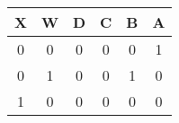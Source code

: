 \begin{tabular}{|c|c||c|c|c|c|}
\hline
X & W & D & C & B & A\\
\hline
0 & 0 & 0 & 0 & 0 & 1\\
0 & 1 & 0 & 0 & 1 & 0\\
1 & 0 & 0 & 0 & 0 & 0\\
\hline
\end{tabular}
